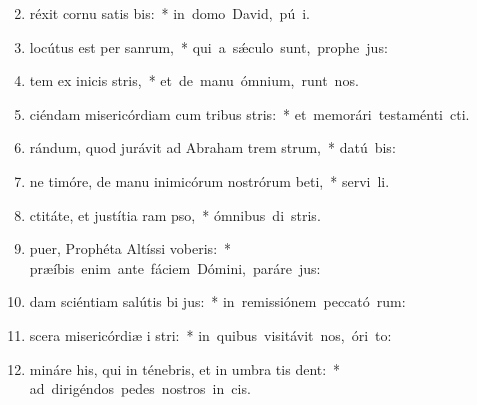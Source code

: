 \begin{flushleft}
\begin{enumerate}[leftmargin=*]
\setcounter{enumi}{1}

\item {}réxit cornu satis bis:~* \mbox{in domo David, pú i.}
\item {} locútus est per  sanrum,~* \mbox{qui a s\'{\ae}culo sunt, prophe jus:}
\item {}tem ex inicis stris,~* \mbox{et de manu ómnium,  runt nos.}
\item {}ciéndam misericórdiam cum tribus stris:~* \mbox{et memorári testaménti  cti.}
\item {}rándum, quod jurávit ad Abraham trem strum,~* \mbox{datú  bis:}
\item {}ne timóre, de manu inimicórum nostrórum beti,~* \mbox{servi li.}
\item {}ctitáte, et justítia ram pso,~* \mbox{ómnibus di stris.}
\item {} puer, Prophéta Altíssi voberis:~* \mbox{præíbis enim ante fáciem Dómini, paráre  jus:}
\item {}dam sciéntiam salútis bi jus:~* \mbox{in remissiónem peccató rum:}
\item {}scera misericórdiæ i stri:~* \mbox{in quibus visitávit nos, óri  to:}
\item {}mináre his, qui in ténebris, et in umbra tis dent:~* \mbox{ad dirigéndos pedes nostros in  cis.}

\end{enumerate}
\end{flushleft}

